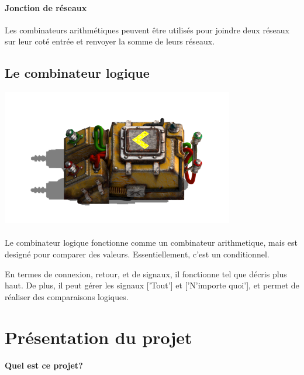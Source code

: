 \documentclass{scrreprt}
\begin{document}
    	\paragraph{Jonction de réseaux}
    	Les combinateurs arithmétiques peuvent être utilisés pour joindre deux réseaux sur leur coté entrée et renvoyer la somme de leurs réseaux.
    	
    \subsection{Le combinateur logique}
	    \begin{minipage}[t]{\textwidth}
	    	
	    	{
	    		\centering
	    		\includegraphics{pics/factorio-decider.png}
    		}
	    	
	    \end{minipage} 
    
    	\paragraph{}
    	Le combinateur logique fonctionne comme un combinateur arithmetique, mais est designé pour comparer des valeurs.
    	Essentiellement, c'est un conditionnel.
    	
    	En termes de connexion, retour, et de signaux, il fonctionne tel que décris plus haut. De plus, il peut gérer les signaux ['Tout'] et ['N'importe quoi'], et permet de réaliser des comparaisons logiques. 
    	
    	\section{Présentation du projet}
    	
    	\paragraph{Quel est ce projet?}
    	
\end{document}
